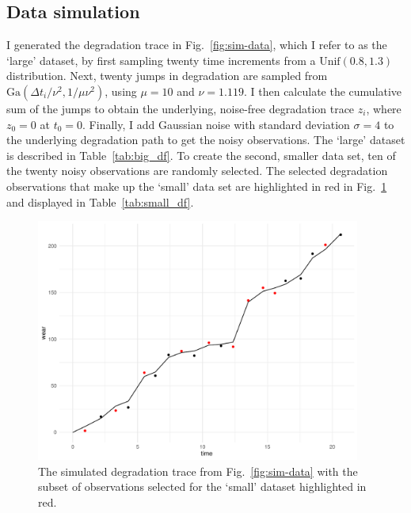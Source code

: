 \subsection{Data simulation}

I generated the degradation trace in Fig.~\ref{fig:sim-data}, which I refer to as the `large' dataset, by first sampling twenty time increments from a $\mbox{Unif}(0.8, 1.3)$ distribution. Next, twenty jumps in degradation are sampled from $\mbox{Ga}(\Delta t_i/\nu^2, 1/\mu\nu^2)$, using $\mu = 10$ and $\nu = 1.119$. I then calculate the cumulative sum of the jumps to obtain the underlying, noise-free degradation trace $z_i$, where $z_0 = 0$ at $t_0 = 0$. Finally, I add Gaussian noise with standard deviation $\sigma = 4$ to the underlying degradation path to get the noisy observations. The `large' dataset is described in Table~\ref{tab:big_df}. To create the second, smaller data set, ten of the twenty noisy observations are randomly selected. The selected degradation observations that make up the `small' data set are highlighted in red in Fig.~\ref{fig:sim-data-small} and displayed in Table~\ref{tab:small_df}.

\begin{figure}
  \centering
  \includegraphics[width=0.95\textwidth]{./figures/ch-4/SimData_big_small.pdf}
  \caption{The simulated degradation trace from Fig.~\ref{fig:sim-data} with the subset of observations selected for the `small' dataset highlighted in red.}
  \label{fig:sim-data-small}
\end{figure}





